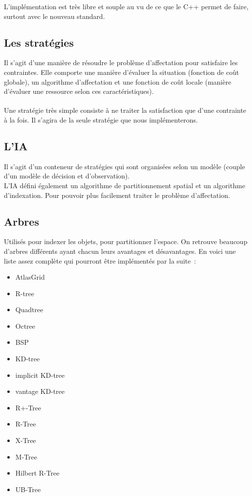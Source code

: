 L'implémentation est très libre et souple au vu de ce que le C++ permet de faire, surtout avec le nouveau standard.

\subsection{Les stratégies}

Il s'agit d'une manière de résoudre le problème d'affectation pour satisfaire les contraintes. Elle comporte une manière d'évaluer la situation (fonction de coût globale), un algorithme d'affectation et une fonction de coût locale (manière d'évaluer une ressource selon ces caractéristiques).\\\\

Une stratégie très simple consiste à ne traiter la satisfaction que d'une contrainte à la fois. Il s'agira de la seule stratégie que nous implémenterons.

\subsection{L'IA}

Il s'agit d'un conteneur de stratégies qui sont organisées selon un modèle (couple d'un modèle de décision et d'observation).\\
\indent L'IA défini également un algorithme de partitionnement spatial et un algorithme d'indexation.
Pour pouvoir plus facilement traiter le problème d'affectation.

\subsection{Arbres}

Utilisés pour indexer les objets, pour partitionner l'espace. On retrouve beaucoup d'arbres différents ayant chacun leurs avantages et désavantages. En voici une liste assez complète qui pourront être implémentés par la suite~:
\begin{itemize}
\item AtlasGrid
\item R-tree
\item Quadtree
\item Octree
\item BSP
\item KD-tree
\item implicit KD-tree
\item vantage KD-tree
\item R+-Tree
\item R-Tree
\item X-Tree
\item M-Tree
\item Hilbert R-Tree
\item UB-Tree
\end{itemize}

